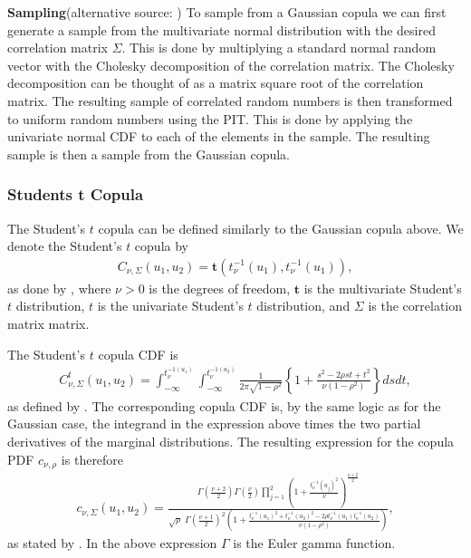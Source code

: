 \textbf{Sampling}(alternative source: )
To sample from a Gaussian copula we can first generate a sample from the multivariate normal distribution with the desired correlation matrix $\Sigma$. This is done by multiplying a standard normal random vector with the Cholesky decomposition of the correlation matrix. The Cholesky decomposition can be thought of as a matrix square root of the correlation matrix. The resulting sample of correlated random numbers is then transformed to uniform random numbers using the \gls{PIT}. This is done by applying the univariate normal \gls{CDF} to each of the elements in the sample. The resulting sample is then a sample from the Gaussian copula\footnotemark[\value{footnote}]. %



\subsubsection{Students t Copula}\label{sec:StudentsCopula} \citet[p.~116]{Umberto2004copulaMethods} 
The Student's $t$ copula can be defined similarly to the Gaussian copula above. We denote the Student's $t$ copula by 
\begin{align*}
    C_{\nu,\Sigma}(u_1,u_2) = \boldsymbol{t}(t_\nu^{-1}(u_1),t_\nu^{-1}(u_1)),
\end{align*}
as done by \citet[p.~268]{Alexander2008}, where $\nu >0$ is the degrees of freedom, $\boldsymbol{t}$ is the multivariate Student's $t$ distribution, $t$ is the univariate Student's $t$ distribution, and $\Sigma$ is the correlation matrix matrix.

The Student's $t$ copula \gls{CDF} is 
\begin{align*}
     C_{\nu,\Sigma}^t (u_1,u_2)
    = \int_{-\infty}^{t_\nu^{-1(u_1)}}\int_{-\infty}^{t_\nu^{-1(u_2)}}
    \frac{1}{2\pi\sqrt{1-\rho^2}} \left\{  1+ \frac{s^2-2\rho st+t^2}{\nu(1-\rho^2)}   \right\} dsdt,
\end{align*}
as defined by \citet[p.~116]{Umberto2004copulaMethods}. The corresponding copula \gls{CDF} is, by the same logic as for the Gaussian case, the integrand in the expression above times the two partial derivatives of the marginal distributions. The resulting expression for the copula \gls{PDF} $c_{\nu,\rho}$ is therefore 
\begin{align*}
    c_{\nu,\Sigma}(u_1,u_2) = \frac{\Gamma(\frac{\nu+2}{2})\Gamma(\frac{\nu}{2})\prod_{j=1}^2\left( 1+ \frac{t_\nu^{-1}(u_j)^2}{\nu}\right)^{\frac{\nu+2}{2}} } {\sqrt{\rho} \;\Gamma(\frac{\nu+1}{2})^{2}\left( 1+ \frac{t_\nu^{-1}(u_1)^2 + t_\nu^{-1}(u_2)^2 -2\rho t_\nu^{-1}(u_1) t_\nu^{-1}(u_2) }{\nu(1-\rho^2)}\right)},
\end{align*}
as stated by . In the above expression $\Gamma$ is the Euler gamma function.

